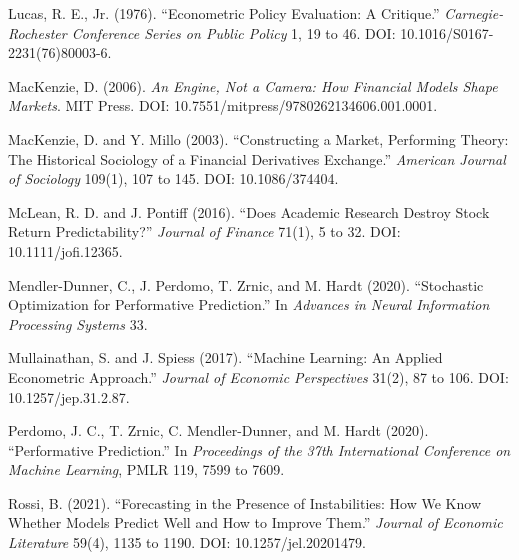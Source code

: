 \documentclass[11pt]{article}
\begin{document}
\begin{small}
Lucas, R. E., Jr. (1976). ``Econometric Policy Evaluation: A Critique.'' \textit{Carnegie-Rochester Conference Series on Public Policy} 1, 19 to 46. DOI: 10.1016/S0167-2231(76)80003-6.

MacKenzie, D. (2006). \textit{An Engine, Not a Camera: How Financial Models Shape Markets}. MIT Press. DOI: 10.7551/mitpress/9780262134606.001.0001.

MacKenzie, D. and Y. Millo (2003). ``Constructing a Market, Performing Theory: The Historical Sociology of a Financial Derivatives Exchange.'' \textit{American Journal of Sociology} 109(1), 107 to 145. DOI: 10.1086/374404.

McLean, R. D. and J. Pontiff (2016). ``Does Academic Research Destroy Stock Return Predictability?'' \textit{Journal of Finance} 71(1), 5 to 32. DOI: 10.1111/jofi.12365.

Mendler-Dunner, C., J. Perdomo, T. Zrnic, and M. Hardt (2020). ``Stochastic Optimization for Performative Prediction.'' In \textit{Advances in Neural Information Processing Systems} 33.

Mullainathan, S. and J. Spiess (2017). ``Machine Learning: An Applied Econometric Approach.'' \textit{Journal of Economic Perspectives} 31(2), 87 to 106. DOI: 10.1257/jep.31.2.87.

Perdomo, J. C., T. Zrnic, C. Mendler-Dunner, and M. Hardt (2020). ``Performative Prediction.'' In \textit{Proceedings of the 37th International Conference on Machine Learning}, PMLR 119, 7599 to 7609.

Rossi, B. (2021). ``Forecasting in the Presence of Instabilities: How We Know Whether Models Predict Well and How to Improve Them.'' \textit{Journal of Economic Literature} 59(4), 1135 to 1190. DOI: 10.1257/jel.20201479.
\end{small}
\end{document}
